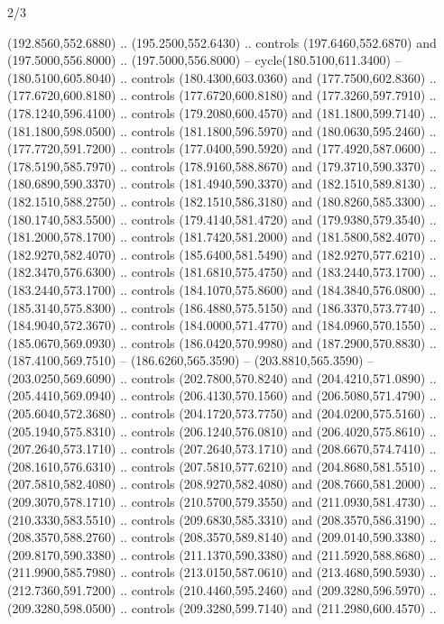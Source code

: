 \begin{flagdescription}{2/3}
\begin{scope} [xshift=0.5\flaglength,yshift=\flagwidth/3.75]
\begin{scope}[y=-\flagwidth/358, x=\flagwidth/346,xshift=-0.565\flagwidth,
   yshift=2.0084\flagwidth]
\begin{scope}[draw=black,fill=white,line width=0.768\lw]
  (192.8560,552.6880) .. (195.2500,552.6430) .. controls (197.6460,552.6870) and
  (197.5000,556.8000) .. (197.5000,556.8000) -- cycle(180.5100,611.3400) --
  (180.5100,605.8040) .. controls (180.4300,603.0360) and (177.7500,602.8360) ..
  (177.6720,600.8180) .. controls (177.6720,600.8180) and (177.3260,597.7910) ..
  (178.1240,596.4100) .. controls (179.2080,600.4570) and (181.1800,599.7140) ..
  (181.1800,598.0500) .. controls (181.1800,596.5970) and (180.0630,595.2460) ..
  (177.7720,591.7200) .. controls (177.0400,590.5920) and (177.4920,587.0600) ..
  (178.5190,585.7970) .. controls (178.9160,588.8670) and (179.3710,590.3370) ..
  (180.6890,590.3370) .. controls (181.4940,590.3370) and (182.1510,589.8130) ..
  (182.1510,588.2750) .. controls (182.1510,586.3180) and (180.8260,585.3300) ..
  (180.1740,583.5500) .. controls (179.4140,581.4720) and (179.9380,579.3540) ..
  (181.2000,578.1700) .. controls (181.7420,581.2000) and (181.5800,582.4070) ..
  (182.9270,582.4070) .. controls (185.6400,581.5490) and (182.9270,577.6210) ..
  (182.3470,576.6300) .. controls (181.6810,575.4750) and (183.2440,573.1700) ..
  (183.2440,573.1700) .. controls (184.1070,575.8600) and (184.3840,576.0800) ..
  (185.3140,575.8300) .. controls (186.4880,575.5150) and (186.3370,573.7740) ..
  (184.9040,572.3670) .. controls (184.0000,571.4770) and (184.0960,570.1550) ..
  (185.0670,569.0930) .. controls (186.0420,570.9980) and (187.2900,570.8830) ..
  (187.4100,569.7510) -- (186.6260,565.3590) -- (203.8810,565.3590) --
  (203.0250,569.6090) .. controls (202.7800,570.8240) and (204.4210,571.0890) ..
  (205.4410,569.0940) .. controls (206.4130,570.1560) and (206.5080,571.4790) ..
  (205.6040,572.3680) .. controls (204.1720,573.7750) and (204.0200,575.5160) ..
  (205.1940,575.8310) .. controls (206.1240,576.0810) and (206.4020,575.8610) ..
  (207.2640,573.1710) .. controls (207.2640,573.1710) and (208.6670,574.7410) ..
  (208.1610,576.6310) .. controls (207.5810,577.6210) and (204.8680,581.5510) ..
  (207.5810,582.4080) .. controls (208.9270,582.4080) and (208.7660,581.2000) ..
  (209.3070,578.1710) .. controls (210.5700,579.3550) and (211.0930,581.4730) ..
  (210.3330,583.5510) .. controls (209.6830,585.3310) and (208.3570,586.3190) ..
  (208.3570,588.2760) .. controls (208.3570,589.8140) and (209.0140,590.3380) ..
  (209.8170,590.3380) .. controls (211.1370,590.3380) and (211.5920,588.8680) ..
  (211.9900,585.7980) .. controls (213.0150,587.0610) and (213.4680,590.5930) ..
  (212.7360,591.7200) .. controls (210.4460,595.2460) and (209.3280,596.5970) ..
  (209.3280,598.0500) .. controls (209.3280,599.7140) and (211.2980,600.4570) ..

\end{scope}
\end{scope}
\end{scope}
\end{flagdescription}
